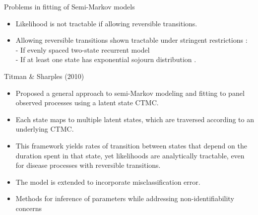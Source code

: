 \documentclass{beamer}
\begin{document}
\begin{frame}{Problems in fitting of Semi-Markov models}
\begin{itemize}
\item Likelihood is not tractable if allowing reversible transitions. \citep{chen2004semi,foucher2010flexible}
\item Allowing reversible transitions shown tractable under stringent restrictions : \\- If evenly spaced two-state recurrent model \citep{rosychuk2001semi}\\- If at least one state has exponential sojourn distribution \citep{kang2007statistical}.
\end{itemize}
\end{frame}
\begin{frame}{Titman \& Sharples (2010)}
\begin{itemize}
\item Proposed a general approach to semi-Markov modeling and fitting to panel observed processes using a latent state CTMC.
\item Each state maps to multiple latent states, which are traversed according to an underlying CTMC.
\item This framework yields rates of transition between states that depend on the duration spent in that state, yet likelihoods are analytically tractable, even for disease processes with reversible transitions.
\item The model is extended to incorporate misclassification error.
\item Methods for inference of parameters while addressing non-identifiability concerns

\end{itemize}
\end{frame}
\end{document}
